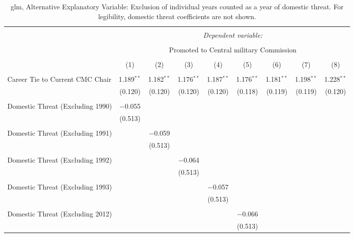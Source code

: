 
\begin{table}[!htbp] \centering 
  \caption{glm, Alternative Explanatory Variable: Exclusion of individual years counted as a year of domestic threat. For legibility, domestic threat coefficients are not shown.} 
  \label{table_a16} 
\begin{tabular}{@{\extracolsep{5pt}}lcccccccc} 
\\[-1.8ex]\hline 
\hline \\[-1.8ex] 
 & \multicolumn{8}{c}{\textit{Dependent variable:}} \\ 
\cline{2-9} 
\\[-1.8ex] & \multicolumn{8}{c}{Promoted to Central military Commission} \\ 
\\[-1.8ex] & (1) & (2) & (3) & (4) & (5) & (6) & (7) & (8)\\ 
\hline \\[-1.8ex] 
 Career Tie to Current CMC Chair & 1.189$^{**}$ & 1.182$^{**}$ & 1.176$^{**}$ & 1.187$^{**}$ & 1.176$^{**}$ & 1.181$^{**}$ & 1.198$^{**}$ & 1.228$^{**}$ \\ 
  & (0.120) & (0.120) & (0.120) & (0.120) & (0.118) & (0.119) & (0.119) & (0.120) \\ 
  & & & & & & & & \\ 
 Domestic Threat (Excluding 1990) & $-$0.055 &  &  &  &  &  &  &  \\ 
  & (0.513) &  &  &  &  &  &  &  \\ 
  & & & & & & & & \\ 
 Domestic Threat (Excluding 1991) &  & $-$0.059 &  &  &  &  &  &  \\ 
  &  & (0.513) &  &  &  &  &  &  \\ 
  & & & & & & & & \\ 
 Domestic Threat (Excluding 1992) &  &  & $-$0.064 &  &  &  &  &  \\ 
  &  &  & (0.513) &  &  &  &  &  \\ 
  & & & & & & & & \\ 
 Domestic Threat (Excluding 1993) &  &  &  & $-$0.057 &  &  &  &  \\ 
  &  &  &  & (0.513) &  &  &  &  \\ 
  & & & & & & & & \\ 
 Domestic Threat (Excluding 2012) &  &  &  &  & $-$0.066 &  &  &  \\ 
  &  &  &  &  & (0.513) &  &  &  \\ 

\end{tabular}
\end{table}
